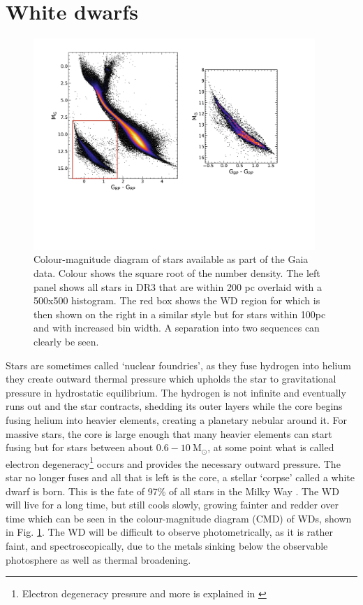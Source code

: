 \section{White dwarfs}\label{sec:p2-whitedwarfs}
\begin{figure}[t]
    \centering
    \includegraphics[width=0.95\textwidth]{images/gaiacmr.pdf}
    \caption{Colour-magnitude diagram of stars available as part of the Gaia data. Colour shows the square root of the number density. The left panel shows all stars in DR3 that are within 200 pc overlaid with a 500x500 histogram. The red box shows the WD region for which is then shown on the right in a similar style but for stars within 100pc and with increased bin width. A separation into two sequences can clearly be seen.} %
    \label{fig:cmd}
\end{figure}
Stars are sometimes called `nuclear foundries', as they fuse hydrogen into helium they create outward thermal pressure which upholds the star to gravitational pressure in hydrostatic equilibrium. The hydrogen is not infinite and eventually runs out and the star contracts, shedding its outer layers while the core begins fusing helium into heavier elements, creating a planetary nebular around it. For massive stars, the core is large enough that many heavier elements can start fusing but for stars between about $0.6-10\ \mathrm{M}_\odot$, at some point what is called electron degeneracy\footnote{Electron degeneracy pressure and more is explained in \cite{kippenhahn:12}} occurs and provides the necessary outward pressure. The star no longer fuses and all that is left is the core, a stellar `corpse' called a white dwarf is born. This is the fate of 97\% of all stars in the Milky Way \cite{fontaine:01}. The WD will live for a long time, but still cools slowly, growing fainter and redder over time which can be seen in the colour-magnitude diagram (CMD) of WDs, shown in Fig. \ref{fig:cmd}. The WD will be difficult to observe photometrically, as it is rather faint, and spectroscopically, due to the metals sinking below the observable photosphere as well as thermal broadening. 

